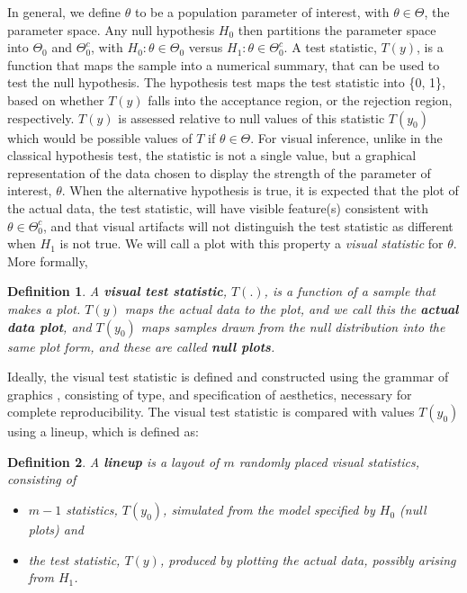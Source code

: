 \documentclass{article}
\newtheorem{dfn}{Definition}[section]
\begin{document}
In general, we define $\theta$ to be a population parameter of interest, with $\theta \in \Theta$, the parameter space. Any null hypothesis $H_0$ then partitions the parameter space into $\Theta_0$ and $\Theta_0^c$, with $H_0: \theta \in \Theta_0$ versus $H_1: \theta \in \Theta_0^c$. A test statistic, $T(y)$, is a function that maps the sample into a numerical summary, that can be used to test the null hypothesis. The hypothesis test maps the test statistic into \{0, 1\}, based on whether $T(y)$ falls into the acceptance region, or the rejection region, respectively. $T(y)$ is assessed relative to null values of this statistic $T(y_0)$ which would be possible values of $T$ if $\theta \in \Theta$.  %
For visual inference, unlike in the classical hypothesis test, the statistic is not a single value, but a graphical representation of the data chosen to display the strength of the parameter of interest, $\theta$. When the alternative hypothesis is true, it is expected that the plot of the actual data, the test statistic, will have visible feature(s) consistent with $\theta \in \Theta_0^c$, and that visual artifacts will not distinguish the test statistic as different when $H_1$ is not true. We will call a plot with this property a {\it visual statistic} for $\theta$. More formally, 

\begin{dfn} \label{dfn:test}
A \textbf{visual test statistic}, $T(.)$, is a function of a sample that makes a plot. $T(y)$ maps the actual data to the plot, and we call this the \textbf{actual data plot}, and $T(y_0)$ maps samples drawn from the null distribution into the same plot form, and these are called \textbf{null plots}. 
\end{dfn}

\noindent Ideally, the visual test statistic is defined and constructed using the grammar of graphics \citep{wilkinson:1999,hadley:2009}, consisting of type, and specification of aesthetics, necessary for complete reproducibility. The visual test statistic is compared with values $T(y_0)$ using a lineup, which is defined as:

\begin{dfn}\label{dfn:lplot}
A \textbf{lineup} is a layout of $m$ randomly placed visual statistics, consisting of 
\begin{itemize}\itemsep-3pt
\item $m-1$ statistics, $T(y_0)$, simulated from the model specified by $H_0$  (null plots) and 
\item the test statistic, $T(y)$, produced by plotting the actual data, possibly arising from $H_1$.
\end{itemize}
\end{dfn}
\end{document}
